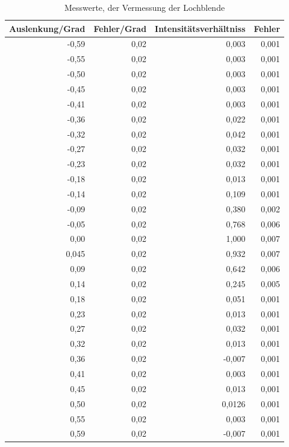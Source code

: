 \documentclass[12pt]{scrartcl}
\begin{document}
\begin{table}[H]
\caption{Messwerte, der Vermessung der Lochblende}
\begin{center}
\begin{tabular}{|r|r|r|r|}
\hline
\multicolumn{1}{|l|}{Auslenkung/Grad} & \multicolumn{1}{l|}{Fehler/Grad} & \multicolumn{1}{l|}{Intensitätsverhältniss} & \multicolumn{1}{l|}{Fehler} \\ \hline
-0,59 & 0,02 & 0,003 & 0,001 \\ \hline
-0,55 & 0,02 & 0,003 & 0,001 \\ \hline
-0,50 & 0,02 & 0,003 & 0,001 \\ \hline
-0,45 & 0,02 & 0,003 & 0,001 \\ \hline
-0,41 & 0,02 & 0,003 & 0,001 \\ \hline
-0,36 & 0,02 & 0,022 & 0,001 \\ \hline
-0,32 & 0,02 & 0,042 & 0,001 \\ \hline
-0,27 & 0,02 & 0,032 & 0,001 \\ \hline
-0,23 & 0,02 & 0,032 & 0,001 \\ \hline
-0,18 & 0,02 & 0,013 & 0,001 \\ \hline
-0,14 & 0,02 & 0,109 & 0,001 \\ \hline
-0,09 & 0,02 & 0,380 & 0,002 \\ \hline
-0,05 & 0,02 & 0,768 & 0,006 \\ \hline
0,00 & 0,02 & 1,000 & 0,007 \\ \hline
0,045 & 0,02 & 0,932 & 0,007 \\ \hline
0,09 & 0,02 & 0,642 & 0,006 \\ \hline
0,14 & 0,02 & 0,245 & 0,005 \\ \hline
0,18 & 0,02 & 0,051 & 0,001 \\ \hline
0,23 & 0,02 & 0,013 & 0,001 \\ \hline
0,27 & 0,02 & 0,032 & 0,001 \\ \hline
0,32 & 0,02 & 0,013 & 0,001 \\ \hline
0,36 & 0,02 & -0,007 & 0,001 \\ \hline
0,41 & 0,02 & 0,003 & 0,001 \\ \hline
0,45 & 0,02 & 0,013 & 0,001 \\ \hline
0,50 & 0,02 & 0,0126 & 0,001 \\ \hline
0,55 & 0,02 & 0,003 & 0,001 \\ \hline
0,59 & 0,02 & -0,007 & 0,001 \\ \hline
\end{tabular}
\end{center}
\label{tab:a_2_m}
\end{table}
\end{document}
